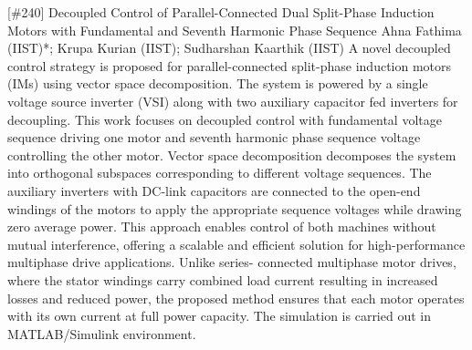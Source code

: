 {} \begin{abstract_online} {[\#240] Decoupled Control of Parallel-Connected Dual Split-Phase Induction Motors with Fundamental and Seventh Harmonic Phase Sequence} {} {Ahna Fathima (IIST)*; Krupa Kurian (IIST); Sudharshan Kaarthik (IIST)} {} A novel decoupled control strategy is proposed for parallel-connected split-phase induction motors (IMs) using vector space decomposition. The system is powered by a single voltage source inverter (VSI) along with two auxiliary capacitor fed inverters for decoupling. This work focuses on decoupled control with fundamental voltage sequence driving one motor and seventh harmonic phase sequence voltage controlling the other motor. Vector space decomposition decomposes the system into orthogonal subspaces corresponding to different voltage sequences. The auxiliary inverters with DC-link capacitors are connected to the open-end windings of the motors to apply the appropriate sequence voltages while drawing zero average power. This approach enables control of both machines without mutual interference, offering a scalable and efficient solution for high-performance multiphase drive applications. Unlike series- connected multiphase motor drives, where the stator windings carry combined load current resulting in increased losses and reduced power, the proposed method ensures that each motor operates with its own current at full power capacity. The simulation is carried out in MATLAB/Simulink environment. \end{abstract_online} 
